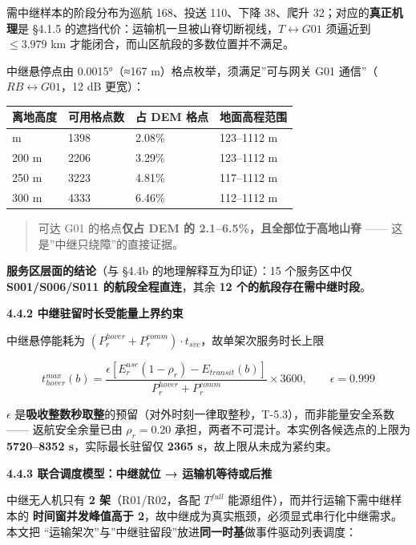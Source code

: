 \documentclass[
  10.5pt,
]{extarticle}
\newcounter{none} %
\begin{document}
需中继样本的阶段分布为巡航 168、投送 110、下降 38、爬升
32；对应的\textbf{真正机理}是 §4.1.5
的遮挡代价：运输机一旦被山脊切断视线，\(T\leftrightarrow G01\) 须逼近到
\(\le 3.979\) km 才能闭合，而山区航段的多数位置并不满足。

中继悬停点由 0.0015°（≈167 m）格点枚举，须满足''可与网关 G01
通信''（\(RB\leftrightarrow G01\)，12 dB 更宽）：

{\def\LTcaptype{none} %
\begin{longtable}[]{@{}llll@{}}
\toprule\noalign{}
离地高度 & 可用格点数 & 占 DEM 格点 & 地面高程范围 \\
\midrule\noalign{}
\endhead
\bottomrule\noalign{}
\endlastfoot
150 m & 1398 & 2.08\% & 123--1112 m \\
200 m & 2206 & 3.29\% & 123--1112 m \\
250 m & 3223 & 4.81\% & 117--1112 m \\
300 m & 4333 & 6.46\% & 112--1112 m \\
\end{longtable}
}

\begin{quote}
可达 G01 的格点\textbf{仅占 DEM 的 2.1--6.5\%，且全部位于高地山脊}
------ 这是''中继只绕障''的直接证据。
\end{quote}

\textbf{服务区层面的结论}（与 §4.4b 的地理解释互为印证）：15
个服务区中仅 \textbf{S001/S006/S011 的航段全程直连}，其余 \textbf{12
个的航段存在需中继时段}。

\textbf{4.4.2 中继驻留时长受能量上界约束}

中继悬停能耗为
\((P^{hover}_r+P^{comm}_r)\cdot t_{svc}\)，故单架次服务时长上限

\[t^{max}_{hover}(b)=\frac{\epsilon\left[E^{use}_r(1-\rho_r)-E_{transit}(b)\right]}{P^{hover}_r+P^{comm}_r}\times 3600,\qquad \epsilon=0.999\]

\(\epsilon\)
是\textbf{吸收整数秒取整}的预留（对外时刻一律取整秒，T-5.3），而非能量安全系数------
返航安全余量已由 \(\rho_r=0.20\)
承担，两者不可混计。本实例各候选点的上限为 \textbf{5720--8352
s}，实际最长驻留仅 \textbf{2365 s}，故上限从未成为紧约束。

\textbf{4.4.3 联合调度模型：中继就位 → 运输机等待或后推}

中继无人机只有 \textbf{2 架}（R01/R02，各配 \(T^{full}\)
能源组件），而并行运输下需中继样本的 \textbf{时间窗并发峰值高于
2}，故中继成为真实瓶颈，必须显式串行化中继需求。本文把
``运输架次''与''中继驻留段''放进\textbf{同一时基}做事件驱动列表调度：
\end{document}
